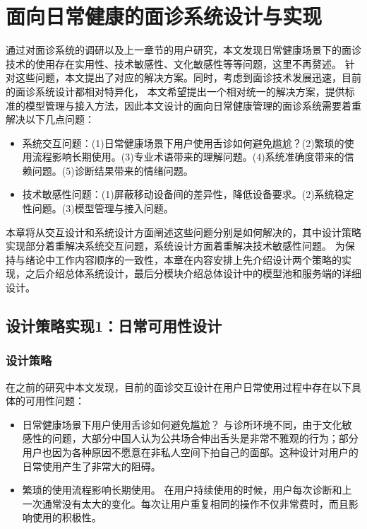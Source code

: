 \chapter{面向日常健康的面诊系统设计与实现}

通过对面诊系统的调研以及上一章节的用户研究，本文发现日常健康场景下的面诊技术的使用存在实用性、技术敏感性、文化敏感性等等问题，这里不再赘述。
针对这些问题，本文提出了对应的解决方案。同时，考虑到面诊技术发展迅速，目前的面诊系统设计都相对特异化，
本文希望提出一个相对统一的解决方案，提供标准的模型管理与接入方法，因此本文设计的面向日常健康管理的面诊系统需要着重解决以下几点问题：
\begin{itemize}
    \item 系统交互问题：(1)日常健康场景下用户使用舌诊如何避免尴尬？(2)繁琐的使用流程影响长期使用。(3)专业术语带来的理解问题。(4)系统准确度带来的信赖问题。(5)诊断结果带来的情绪问题。
    \item 技术敏感性问题：(1)屏蔽移动设备间的差异性，降低设备要求。(2)系统稳定性问题。(3)模型管理与接入问题。
\end{itemize}

本章将从交互设计和系统设计方面阐述这些问题分别是如何解决的，其中设计策略实现部分着重解决系统交互问题，系统设计方面着重解决技术敏感性问题。
为保持与绪论中工作内容顺序的一致性，本章在内容安排上先介绍设计两个策略的实现，之后介绍总体系统设计，最后分模块介绍总体设计中的模型池和服务端的详细设计。

\section{设计策略实现1：日常可用性设计}

\subsection{设计策略}
在之前的研究中本文发现，目前的面诊交互设计在用户日常使用过程中存在以下具体的可用性问题：
\begin{itemize}
    \item 日常健康场景下用户使用舌诊如何避免尴尬？
    与诊所环境不同，由于文化敏感性的问题，大部分中国人认为公共场合伸出舌头是非常不雅观的行为；部分用户也因为各种原因不愿意在非私人空间下拍自己的面部。这种设计对用户的日常使用产生了非常大的阻碍。
    \item 繁琐的使用流程影响长期使用。
    在用户持续使用的时候，用户每次诊断和上一次通常没有太大的变化。每次让用户重复相同的操作不仅非常费时，而且影响使用的积极性。
\end{itemize}

